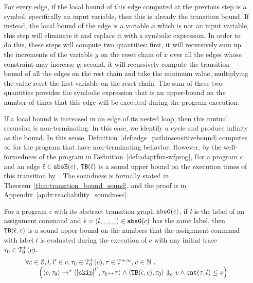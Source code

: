 \begin{enumerate}
For every edge, if the local bound of this edge computed at the previous step is a symbol, specifically an input variable, then this is already the transition bound.
If instead, the local bound of the edge is a variable $x$ which is not an input variable, this step will eliminate it and replace it with a symbolic expression. 
In order to do this, these steps will compute two quantities: first, it will recursively sum up the increments of the variable $y$ on the reset chain of $x$ over all the edges whose constraint may increase $y$;
second, it will recursively compute the transition bound of all the edges on the rest chain and take the minimum value, multiplying the value reset the first variable on the reset chain.
The sum of these two quantities provides the symbolic expression that is an upper-bound on the
number of times that this edge will be executed during the program execution.

If a local bound is increased in an edge of its nested loop, then this mutual recursion is non-terminating. In this case, we identify a cycle and produce infinity as the bound.
In this sense,
Definition~\ref{def:edge_pathinsensitivebound} computes $\infty$ for the program that
have non-terminating behavior.
However, by the well-formedness of the program in Definition~\ref{def:adaptfun-wfprog}, 
For a program $c$ and an edge $\hat{\mathtt{\epsilon}{}} \in \mathtt{abs}{\mathtt{E}}(c)$,
${\mathtt{TB}}(\hat{\mathtt{\epsilon}{}})$ is a sound upper bound
on the execution times of this transition by~\cite{SinnZV17}.
The soundness is formally stated in Theorem~\ref{thm:transition_bound_sound}, and the proof is in Appendix~\ref{apdx:reachability_soundness}.
%



\begin{thm}
 \label{thm:transition_bound_sound}
For a program ${c}$ with its abstract transition graph $\mathtt{abs}{\mathtt{G}}(c)$, if $l$ is the label of an assignment 
command and $\hat{\mathtt{\epsilon}{}} = (l, \_, \_) \in \mathtt{abs}{\mathtt{G}}(c)$ has the same label,
then ${\mathtt{TB}}(\hat{\mathtt{\epsilon}{}}, c)$ 
 is a sound upper bound on 
the numbers that the assignment command with label $l$ is evaluated during the execution of $c$ with any
initial trace $\mathtt{\tau}_0 \in \mathcal{T}^{+}_0(c)$.
 \[
 \begin{array}{l}
 \forall c \in \cdom, l, l' \in c,\trace_0 \in \ftdom_0(c), 
 \trace \in \tdom, v \in \mathbb{N}
 \st 
 \\ \qquad 
 \Big(\config{{c}, \trace_0} \to^{*} \config{\clabel{\eskip}^{l'}, \trace_0\tracecat\vtrace} 
 \land \config{\absclr(\absevent, c), \trace_0} \aarrow v
 \land
 \vcounter(\trace, l) \leq v
 \Big)
 \end{array}
 \]
\end{thm}
%
\end{enumerate}


